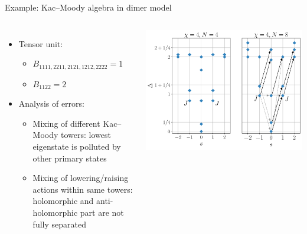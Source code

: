 \documentclass{fdubeamer}
\newcommand{\1}{\mathbb{1}}
\begin{document}
\begin{frame}{Example: Kac--Moody algebra in dimer model}

\begin{columns}[T]


    \begin{itemize}
      \item Tensor unit:

        \begin{itemize}
          \item $B_{1111,2211,2121,1212,2222} = 1$
          \item $B_{1122} = 2$
        \end{itemize}

      \item Analysis of errors:

        \begin{itemize}
          \item Mixing of different Kac--Moody towers: lowest eigenstate is polluted by other primary states
          \item Mixing of lowering/raising actions within same towers: holomorphic and anti-holomorphic part are not fully separated
        \end{itemize}
    \end{itemize}


    \vspace{1em}
    \includegraphics[width=\textwidth]{images/virasoro/dimer-spectrum.pdf}

\end{columns}


\end{frame}
\end{document}
